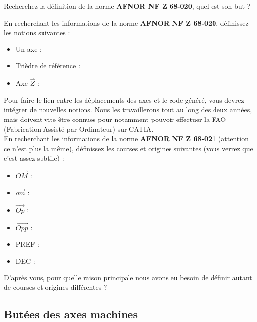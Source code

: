 \documentclass[12pt]{article}
\newcounter{exo}
\newenvironment{exo}{\stepcounter{exo}\vspace{0.5cm}{\bfseries Question \theexo\ :}}{\par\vspace{0.5cm}}
\begin{document}
\begin{exo}\label{exo1} Recherchez la définition de la norme \textbf{AFNOR NF Z 68-020}, quel est son but ?\end{exo}


\begin{exo}\label{exo1} En recherchant les informations de la norme \textbf{AFNOR NF Z 68-020}, définissez les notions suivantes :\end{exo}
\begin{itemize}
    \item Un axe :
    \item Trièdre de référence : 
    \item Axe $\overrightarrow{Z}$ :\\
\end{itemize}

Pour faire le lien entre les déplacements des axes et le code généré, vous devrez intégrer de nouvelles notions. Nous les travaillerons tout au long des deux années, mais doivent vite être connues pour notamment pouvoir effectuer la FAO (Fabrication Assisté par Ordinateur) sur CATIA.\\


\begin{exo}\label{exo1} En recherchant les informations de la norme \textbf{AFNOR NF Z 68-021} (attention ce n'est plus la même), définissez les courses et origines suivantes (vous verrez que c'est assez subtile) :\end{exo}
\begin{itemize}
    \item $\overrightarrow{OM}$ :
    \item $\overrightarrow{om}$ :
    \item $\overrightarrow{Op}$ :
    \item $\overrightarrow{Opp}$ :
    \item PREF :
    \item DEC :
\end{itemize}


\begin{exo}\label{exo1} D'après vous, pour quelle raison principale nous avons eu besoin de définir autant de courses et origines différentes ? \end{exo}




\subsection{Butées des axes machines}
\end{document}
